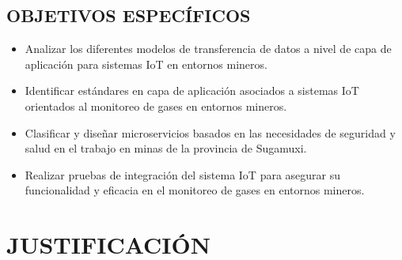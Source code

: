 \documentclass[stu,12pt,floatsintext]{apa7}
\begin{document}
	\subsection{OBJETIVOS ESPECÍFICOS}
	\begin{itemize}
		\item Analizar los diferentes modelos de transferencia de datos a nivel de capa de aplicación para sistemas IoT en entornos mineros.
		\item Identificar estándares en capa de aplicación asociados a sistemas IoT orientados al monitoreo de gases en entornos mineros.
		\item Clasificar y diseñar microservicios basados en las necesidades de seguridad y salud en el trabajo en minas de la provincia de Sugamuxi.
		\item Realizar pruebas de integración del sistema IoT para asegurar su funcionalidad y eficacia en el monitoreo de gases en entornos mineros.
	\end{itemize}
	\section{JUSTIFICACIÓN}
		
\end{document}
